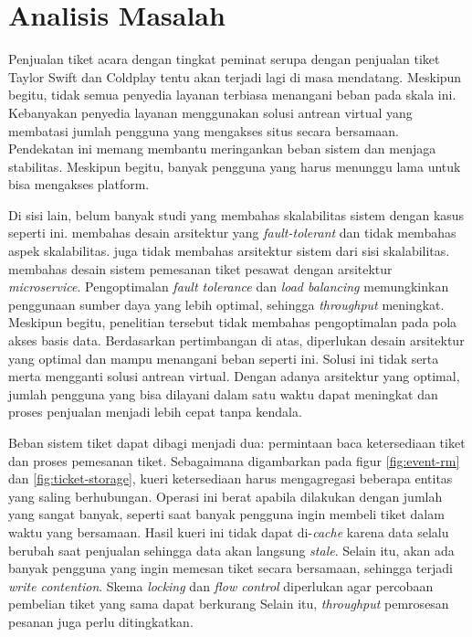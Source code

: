 
\section{Analisis Masalah}

Penjualan tiket acara dengan tingkat peminat serupa dengan penjualan tiket Taylor Swift dan Coldplay tentu akan terjadi lagi di masa mendatang. Meskipun begitu, tidak semua penyedia layanan terbiasa menangani beban pada skala ini. Kebanyakan penyedia layanan menggunakan solusi antrean virtual yang membatasi jumlah pengguna yang mengakses situs secara bersamaan. Pendekatan ini memang membantu meringankan beban sistem dan menjaga stabilitas. Meskipun begitu, banyak pengguna yang harus menunggu lama untuk bisa mengakses platform.

Di sisi lain, belum banyak studi yang membahas skalabilitas sistem dengan kasus seperti ini. \cite{microservicesEventDriven} membahas desain arsitektur yang \textit{fault-tolerant} dan tidak membahas aspek skalabilitas. \cite{backendForTicketing} juga tidak membahas arsitektur sistem dari sisi skalabilitas. \cite{barua2024enhancingresiliencescalabilitytravel} membahas desain sistem pemesanan tiket pesawat dengan arsitektur \textit{microservice}. Pengoptimalan \textit{fault tolerance} dan \textit{load balancing} memungkinkan penggunaan sumber daya yang lebih optimal, sehingga \textit{throughput} meningkat. Meskipun begitu, penelitian tersebut tidak membahas pengoptimalan pada pola akses basis data. Berdasarkan pertimbangan di atas, diperlukan desain arsitektur yang optimal dan mampu menangani beban seperti ini. Solusi ini tidak serta merta mengganti solusi antrean virtual. Dengan adanya arsitektur yang optimal, jumlah pengguna yang bisa dilayani dalam satu waktu dapat meningkat dan proses penjualan menjadi lebih cepat tanpa kendala.

Beban sistem tiket dapat dibagi menjadi dua: permintaan baca ketersediaan tiket dan proses pemesanan tiket. Sebagaimana digambarkan pada figur \ref{fig:event-rm} dan \ref{fig:ticket-storage}, kueri ketersediaan harus mengagregasi beberapa entitas yang saling berhubungan. Operasi ini berat apabila dilakukan dengan jumlah yang sangat banyak, seperti saat banyak pengguna ingin membeli tiket dalam waktu yang bersamaan. Hasil kueri ini tidak dapat di-\textit{cache} karena data selalu berubah saat penjualan sehingga data akan langsung \textit{stale}. Selain itu, akan ada banyak pengguna yang ingin memesan tiket secara bersamaan, sehingga terjadi \textit{write contention}. Skema \textit{locking} dan \textit{flow control} diperlukan agar percobaan pembelian tiket yang sama dapat berkurang Selain itu, \textit{throughput} pemrosesan pesanan juga perlu ditingkatkan.